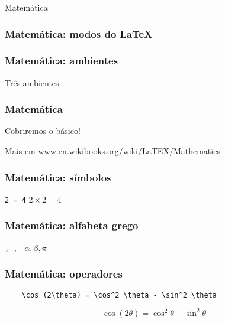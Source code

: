\begin{frame}[standout]
  \Huge
  Matemática
\end{frame}

\begin{frame}
  \frametitle{Matemática: modos do \LaTeX}
  \LARGE
\end{frame}

\begin{frame}[fragile]
  \frametitle{Matemática: ambientes}
  \LARGE
  Três ambientes:\\

\end{frame}

\begin{frame}
  \frametitle{Matemática}
  \LARGE
  Cobriremos o básico!

  Mais em \url{www.en.wikibooks.org/wiki/LaTEX/Mathematics}
\end{frame}

\begin{frame}[fragile]
  \frametitle{Matemática: símbolos}
  \LARGE
  \texttt{2  = 4}
  \hfill
  \( 2 \times 2 = 4 \)
\end{frame}

\begin{frame}[fragile]
  \frametitle{Matemática: alfabeta grego}
  \LARGE
  \texttt{\alpha, \beta, \pi}
  \hfill
  \( \alpha, \beta, \pi \)
\end{frame}

\begin{frame}[fragile]
  \frametitle{Matemática: operadores}
  \begin{verbatim}
    \cos (2\theta) = \cos^2 \theta - \sin^2 \theta
  \end{verbatim}

  \LARGE
  \[ \cos (2\theta) = \cos^2 \theta - \sin^2 \theta \]
\end{frame}

